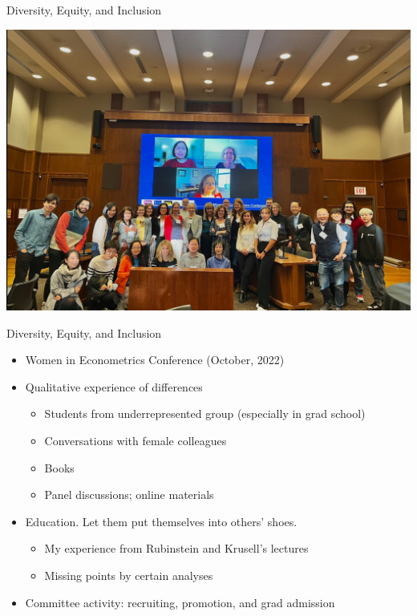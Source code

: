 \documentclass[beamer, t]{beamer}
\newcommand{\bit}{\begin{itemize}}
\newcommand{\eit}{\end{itemize}}
\newcommand{\fm}[1]{\begin{frame}#1\end{frame}}
\begin{document}
\begin{frame}
	\vfill
	\centering
	\LARGE{Diversity, Equity, and Inclusion}
	\vfill
\end{frame}

\fm{
   \includegraphics[width=\textwidth]{figures/conf.png}
}

\begin{frame}{Diversity, Equity, and Inclusion} 
\bit
	\item Women in Econometrics Conference (October, 2022)
	\item Qualitative experience of differences
		\bit
			\item Students from underrepresented group (especially in grad school)
			\item Conversations with female colleagues
			\item Books
			\item Panel discussions; online materials
		\eit
	\item Education. Let them put themselves into others' shoes.
		\bit
			\item My experience from Rubinstein and Krusell's lectures
			\item Missing points by certain analyses
		\eit
	\item Committee activity: recruiting, promotion, and grad admission 
\eit

\end{frame}
\end{document}
